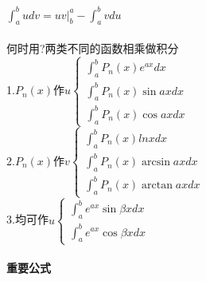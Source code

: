 \documentclass{article}
\begin{document}
\begin{flushleft}
	$\int_{a}^{b}udv=uv|_b^a-\int_{a}^{b}vdu$\\
	~\\
	何时用?两类不同的函数相乘做积分\\
	1.$P_n(x)$作$u \left\{
	\begin{array}{lcl}
	\int_{a}^{b} P_n(x)e^{ax}dx\\
	\int_{a}^{b} P_n(x)\sin axdx\\
	\int_{a}^{b} P_n(x)\cos axdx
	\end{array} \right.$\\
	2.$P_n(x)$作$v \left\{
	\begin{array}{lcl}
	\int_{a}^{b} P_n(x)lnxdx\\
	\int_{a}^{b} P_n(x)\arcsin axdx\\
	\int_{a}^{b} P_n(x)\arctan axdx
	\end{array} \right.$\\
	3.均可作$u \left\{
	\begin{array}{lcl}
	\int_{a}^{b} e^{ax}\sin \beta xdx\\
	\int_{a}^{b} e^{ax}\cos \beta xdx
	\end{array} \right.$\\
	
	~\\ \textbf{重要公式} \\~\\
	

\end{flushleft}
\end{document}
